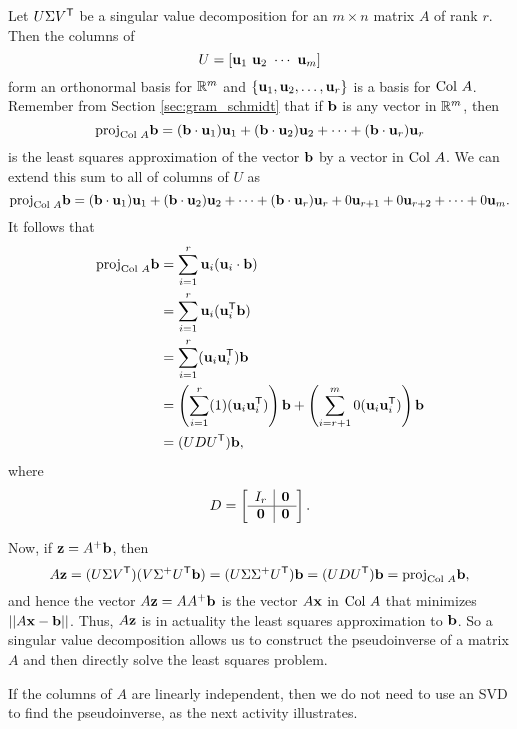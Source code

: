 Let $U \Sigma V^{\mathsf{T}}$ be a singular value decomposition for an $m \times n$ matrix $A$ of rank $r$. Then the columns of
\[U = [\vu_1 \ \vu_2  \ \cdots  \ \vu_m]\]
form an orthonormal basis for $\mathbb{R}^m$ and $\{\mathbf{u}_1, \mathbf{u}_2, \ldots, \mathbf{u}_r\}$ is a basis for $\text{Col } A$. Remember from Section \ref{sec:gram_schmidt}  that if $\mathbf{b}$ is any vector in $\mathbb{R}^m$, then
\[\text{proj}_{\text{Col } A} \mathbf{b} = (\mathbf{b} \cdot \mathbf{u}_1) \mathbf{u}_1 + (\mathbf{b} \cdot \mathbf{u}_2) \mathbf{u}_2 + \cdots + (\mathbf{b} \cdot \mathbf{u}_r) \mathbf{u}_r\]
is the least squares approximation of the vector $\mathbf{b}$ by a vector in $\text{Col } A$. 
We can extend this sum to all of columns of $U$ as
\[\text{proj}_{\text{Col } A} \mathbf{b} = (\mathbf{b} \cdot \mathbf{u}_1) \mathbf{u}_1 + (\mathbf{b} \cdot \mathbf{u}_2) \mathbf{u}_2 + \cdots + (\mathbf{b} \cdot \mathbf{u}_r) \mathbf{u}_r + 0 \mathbf{u}_{r+1} + 0 \mathbf{u}_{r+2} + \cdots + 0 \mathbf{u}_m.\]
It follows that 
\begin{align*}
\text{proj}_{\text{Col } A} \mathbf{b} &= \sum_{i=1}^r \mathbf{u}_i (\mathbf{u}_i \cdot \mathbf{b}) \\
	&= \sum_{i=1}^r \mathbf{u}_i (\mathbf{u}_i^{\mathsf{T}}\mathbf{b}) \\
	&= \sum_{i=1}^r (\mathbf{u}_i\mathbf{u}_i^{\mathsf{T}}) \mathbf{b} \\
	&= \left(\sum_{i=1}^r (1)(\mathbf{u}_i\mathbf{u}_i^{\mathsf{T}})\right)\mathbf{b} + \left(\sum_{i=r+1}^m 0(\mathbf{u}_i\mathbf{u}_i^{\mathsf{T}})\right) \mathbf{b} \\
	&= (UDU^{\mathsf{T}}) \mathbf{b},
\end{align*}
where
\[D = \left[ \begin{array}{c|c} I_r & \mathbf{0} \\ \hline \mathbf{0} & \mathbf{0} \end{array} \right].\]

Now, if $\mathbf{z} = A^{+} \mathbf{b}$, then
\[A\mathbf{z} = (U\Sigma V^{\mathsf{T}})(V \Sigma^+ U^{\mathsf{T}} \mathbf{b}) = (U \Sigma \Sigma^+ U^{\mathsf{T}})\mathbf{b} = (UDU^{\mathsf{T}})\mathbf{b} = \text{proj}_{\text{Col } A} \mathbf{b},\]
and hence the vector $A \mathbf{z} = AA^+ \mathbf{b}$ is the vector $A\mathbf{x}$ in $\text{Col } A$ that minimizes $||A \mathbf{x} - \mathbf{b}||$. Thus, $A\mathbf{z}$ is in actuality the least squares approximation to $\mathbf{b}$. So a singular value decomposition allows us to construct the pseudoinverse of a matrix $A$ and then directly solve the least squares problem. 

If the columns of $A$ are linearly independent, then we do not need to use an SVD to find the pseudoinverse, as the next activity illustrates. 


